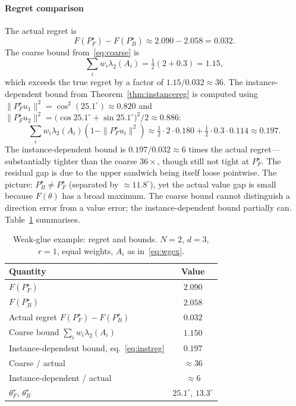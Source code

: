 \documentclass[final,3p,times]{elsarticle}
\begin{document}
\paragraph{Regret comparison}
The actual regret is
\begin{equation}
F(P_F^\star)-F(P_B^\star)\approx 2.090-2.058 = 0.032.
\end{equation}
The coarse bound from~\eqref{eq:coarse} is
\begin{equation}
\sum_i w_i\lambda_2(A_i)=\tfrac{1}{2}(2+0.3)=1.15,
\end{equation}
which exceeds the true regret by a factor of $1.15/0.032\approx 36$.
The instance-dependent bound from Theorem~\ref{thm:instancereg} is
computed using
$\|P_F^\star u_1\|^2=\cos^2(25.1^\circ)\approx 0.820$ and
$\|P_F^\star u_2\|^2=\bigl(\cos 25.1^\circ+\sin 25.1^\circ\bigr)^2/2
\approx 0.886$:
\begin{equation}
\sum_i w_i\lambda_2(A_i)(1-\|P_F^\star u_i\|^2)
\approx \tfrac{1}{2}\cdot 2\cdot 0.180+\tfrac{1}{2}\cdot 0.3\cdot 0.114
\approx 0.197.
\end{equation}
The instance-dependent bound is $0.197/0.032\approx 6$ times the actual
regret---substantially tighter than the coarse $36\times$, though
still not tight at $P_F^\star$.
The residual gap is due to the upper sandwich being itself loose
pointwise.
The picture: $P_B^\star\ne P_F^\star$ (separated by $\approx 11.8^\circ$),
yet the actual value gap is small because $F(\theta)$ has a broad
maximum.
The coarse bound cannot distinguish a direction error from a value
error; the instance-dependent bound partially can.
Table~\ref{tab:wg} summarises.

\begin{table}[tbp]
\caption{Weak-glue example: regret and bounds.
$N=2$, $d=3$, $r=1$, equal weights, $A_i$ as in~\eqref{eq:wgex}.}
\label{tab:wg}
\begin{center}
\begin{tabular}{lc}
\toprule
Quantity & Value \\
\midrule
$F(P_F^\star)$                                & $2.090$ \\
$F(P_B^\star)$                                & $2.058$ \\
Actual regret $F(P_F^\star)-F(P_B^\star)$     & $0.032$ \\
Coarse bound $\sum_i w_i\lambda_2(A_i)$       & $1.150$ \\
Instance-dependent bound, eq.~\eqref{eq:instreg} & $0.197$ \\
Coarse / actual                               & $\approx 36$ \\
Instance-dependent / actual                   & $\approx 6$ \\
$\theta_F^\star$, $\theta_B^\star$            & $25.1^\circ$, $13.3^\circ$ \\
\bottomrule
\end{tabular}
\end{center}
\end{table}
\end{document}
